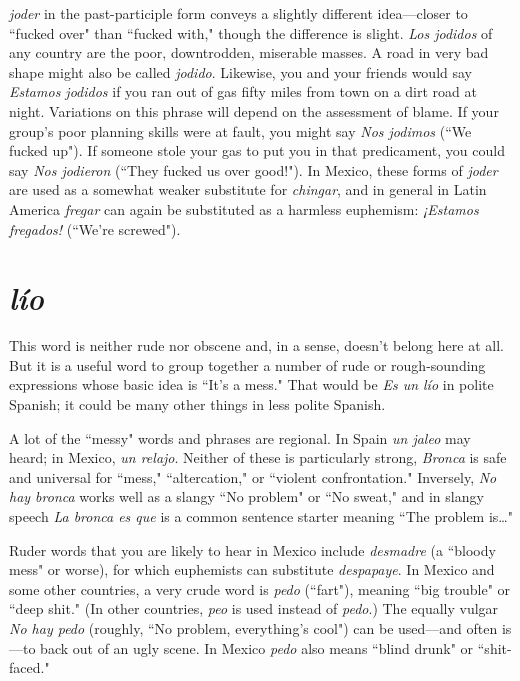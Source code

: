 \emph{joder} in the past-participle form conveys a slightly different
idea---closer to ``fucked over" than ``fucked with," though the difference is slight. \emph{Los jodidos} of any country are the poor, downtrodden,
miserable masses. A road in very bad shape might also be called \emph{jodido}. Likewise, you and your friends would say \emph{Estamos jodidos} if you
ran out of gas fifty miles from town on a dirt road at night. Variations
on this phrase will depend on the assessment of blame. If your group's
poor planning skills were at fault, you might say \emph{Nos jodimos} (``We
fucked up"). If someone stole your gas to put you in that predicament,
you could say \emph{Nos jodieron} (``They fucked us over good!"). In Mexico,
these forms of \emph{joder} are used as a somewhat weaker substitute for
\emph{chingar}, and in general in Latin America \emph{fregar} can again be substituted as a harmless euphemism: \emph{¡Estamos fregados!} (``We're screwed").

\section{\emph{lío}}

This word is neither rude nor obscene and, in a sense, doesn't
belong here at all. But it is a useful word to group together a number of
rude or rough-sounding expressions whose basic idea is ``It's a mess."
That would be \emph{Es un lío} in polite Spanish; it could be many other
things in less polite Spanish.

A lot of the ``messy" words and phrases are regional. In Spain
\emph{un jaleo} may heard; in Mexico, \emph{un relajo}. Neither of these is particularly strong, \emph{Bronca} is safe and universal for ``mess," ``altercation,"
or ``violent confrontation." Inversely, \emph{No hay bronca} works well as a
slangy ``No problem" or ``No sweat," and in slangy speech \emph{La bronca
	es que} is a common sentence starter meaning ``The problem is\ldots{}"

Ruder words that you are likely to hear in Mexico include \emph{desmadre} (a ``bloody mess" or worse), for which euphemists can substitute \emph{despapaye}. In Mexico and some other countries, a very crude
word is \emph{pedo} (``fart"), meaning ``big trouble" or ``deep shit." (In other
countries, \emph{peo} is used instead of \emph{pedo}.) The equally vulgar \emph{No hay
	pedo} (roughly, ``No problem, everything's cool") can be used---and
often is---to back out of an ugly scene. In Mexico \emph{pedo} also means
``blind drunk" or ``shit-faced."

